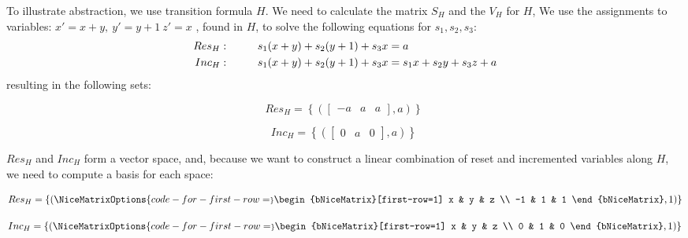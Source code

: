 To illustrate \qvasr abstraction, we use transition formula $H$. We need to calculate the matrix $S_H$ and the \qvasr $V_H$ for $H$, 
We use the assignments to variables: $x' = x + y, \ y'= y + 1\ z' = x$ , found in $H$, to solve the following equations for $s_1, s_2,  s_3$:
\begin{align*}
	Res_H:& \hspace*{1cm} s_1(x + y) + s_2(y + 1) + s_3x = a \\
	Inc_H:& \hspace*{1cm} s_1(x + y) + s_2(y + 1) + s_3x = s_1x + s_2y + s_3z + a
\end{align*}
resulting in the following sets:
\vspace*{-0.5em}
\begin{center}
	\begin{minipage}{0.5\linewidth}
		\begin{equation*}
			Res_H = \left\{ (\begin{bmatrix} -a & a & a \end{bmatrix}, a) \right\}\
		\end{equation*}
	\end{minipage}
	\begin{minipage}{0.4\linewidth}
		\begin{equation*}
			Inc_H = \left\{ (\begin{bmatrix} 0 & a & 0 \end{bmatrix}, a) \right\}\ 
		\end{equation*}
	\end{minipage}
\end{center}
$Res_H$ and $Inc_H$ form a vector space, and, because we want to construct a linear combination of reset and incremented variables along $H$, we need to compute a basis for each space:
\vspace*{-1em}
\begin{center}
	\begin{minipage}{0.5\linewidth}
		\begin{equation*}
			Res_H = \{(
			\NiceMatrixOptions{code-for-first-row=\scriptstyle}
			\begin{bNiceMatrix}[first-row=1]
				x & y & z \\
				-1 & 1 & 1 
			\end{bNiceMatrix}, 1)\}
		\end{equation*}
	\end{minipage}
	\begin{minipage}{0.4\linewidth}
		\begin{equation*}
			Inc_H = \{(
			\NiceMatrixOptions{code-for-first-row=\scriptstyle}
			\begin{bNiceMatrix}[first-row=1] 
				x & y & z \\
				0 & 1 & 0 
			\end{bNiceMatrix}, 1)\}
		\end{equation*}
	\end{minipage}
\end{center}
